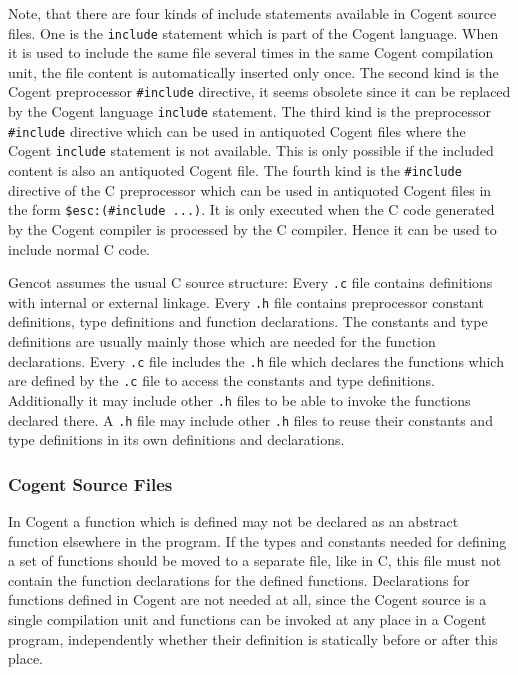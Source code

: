 \documentclass[a4paper]{report}
\newcommand{\code}[1]{\textnormal{\texttt{#1}}}
\begin{document}
Note, that there are four kinds of include statements available in Cogent source files. One is the \code{include} statement which
is part of the Cogent language. When it is used to include the same file several times in the same Cogent compilation unit,
the file content is automatically inserted only once. The second kind is the Cogent preprocessor \code{\#include} directive, 
it seems obsolete since it can be replaced by the Cogent language \code{include} statement.
The third kind is the preprocessor \code{\#include} directive 
which can be used in antiquoted Cogent files where the Cogent \code{include} statement is not available. This is only possible 
if the included content is also an antiquoted Cogent file. The fourth kind
is the \code{\#include} directive of the C preprocessor which can be used in antiquoted Cogent files in the form 
\code{\$esc:(\#include ...)}. It is only executed when the C code generated by the Cogent compiler is processed by the C compiler.
Hence it can be used to include normal C code.

Gencot assumes the usual C source structure: Every \code{.c} file contains definitions with internal or external linkage.
Every \code{.h}
file contains preprocessor constant definitions, type definitions and function declarations. The constants and type definitions 
are usually mainly those which are needed for the function declarations. Every \code{.c} file includes the \code{.h} file which
declares the functions which are defined by the \code{.c} file to access the constants and type definitions. Additionally it may
include other \code{.h} files to be able to invoke the functions declared there. A \code{.h} file may include other \code{.h} files
to reuse their constants and type definitions in its own definitions and declarations.

\subsubsection{Cogent Source Files}

In Cogent a function which is defined may not be declared as an abstract function elsewhere in the program. If the types and constants
needed for defining a set of functions should be moved to a separate file, like in C, this file must not contain the 
function declarations for the defined functions. Declarations for functions defined in Cogent are not needed at all, since the Cogent 
source is a single compilation unit and functions can be invoked at any place in a Cogent program, independently whether their definition 
is statically before or after this place.
\end{document}
